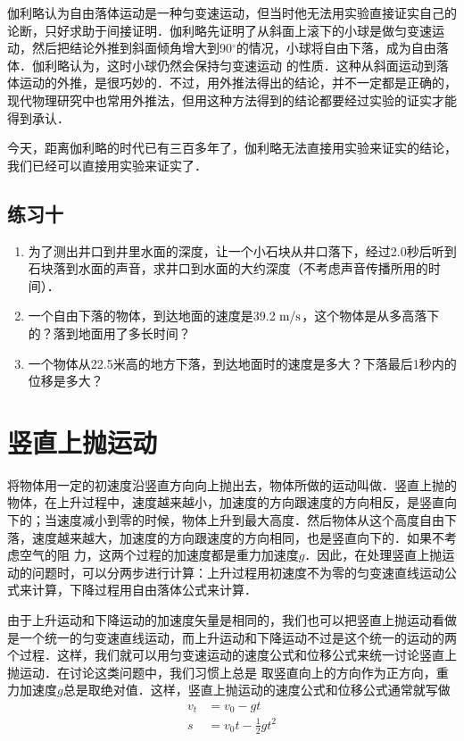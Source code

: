 伽利略认为自由落体运动是一种匀变速运动，但当时他无法用实验直接证实自己的论断，只好求助于间接证明．伽利略先证明了从斜面上滚下的小球是做匀变速运动，然后把结论外推到斜面倾角增大到90$^\circ$的情况，小球将自由下落，成为自由落体．伽利略认为，这时小球仍然会保持匀变速运动
的性质．这种从斜面运动到落体运动的外推，是很巧妙的．不过，用外推法得出的结论，并不一定都是正确的，现代物理研究中也常用外推法，但用这种方法得到的结论都要经过实验的证实才能得到承认．

今天，距离伽利略的时代已有三百多年了，伽利略无法直接用实验来证实的结论，我们已经可以直接用实验来证实了．


\subsection*{练习十}
\begin{enumerate}
	\item 为了测出井口到井里水面的深度，让一个小石块从井口落下，经过2.0秒后听到石块落到水面的声音，求井口到水面的大约深度（不考虑声音传播所用的时间）．
\item 一个自由下落的物体，到达地面的速度是39.2$\;\text{m}/\text{s}$，这个物体是从多高落下的？落到地面用了多长时间？
\item 一个物体从22.5米高的地方下落，到达地面时的速度是多大？下落最后1秒内的位移是多大？
\end{enumerate}


\section{竖直上抛运动}
将物体用一定的初速度沿竖直方向向上抛出去，物体所做的运动叫做．竖直上抛的物体，在上升过程中，速度越来越小，加速度的方向跟速度的方向相反，是竖直向下的；当速度减小到零的时候，物体上升到最大高度．然后物体从这个高度自由下落，速度越来越大，加速度的方向跟速度的方向相同，也是竖直向下的．如果不考虑空气的阻
力，这两个过程的加速度都是重力加速度$g$．因此，在处理竖直上抛运动的问题时，可以分两步进行计算：上升过程用初速度不为零的匀变速直线运动公式来计算，下降过程用自由落体公式来计算．

由于上升运动和下降运动的加速度矢量是相同的，我们也可以把竖直上抛运动看做是一个统一的匀变速直线运动，而上升运动和下降运动不过是这个统一的运动的两个过程．这样，我们就可以用匀变速运动的速度公式和位移公式来统一讨论竖直上抛运动．在讨论这类问题中，我们习惯上总是
取竖直向上的方向作为正方向，重力加速度$g$总是取绝对值．这样，竖直上抛运动的速度公式和位移公式通常就写做
\[\begin{split}
v_t&=v_0-gt\\
s&=v_0 t-\frac{1}{2}gt^2
\end{split}\]

